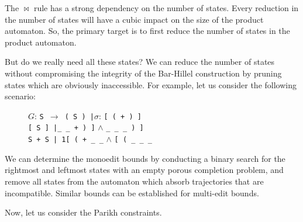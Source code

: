 The $\Join$ rule has a strong dependency on the number of states. Every reduction in the number of states will have a cubic impact on the size of the product automaton. So, the primary target is to first reduce the number of states in the product automaton.

But do we really need all these states? We can reduce the number of states without compromising the integrity of the Bar-Hillel construction by pruning states which are obviously inaccessible. For example, let us consider the following scenario:

\begin{figure}[H]
  \begin{center}
 
 \end{center}
\noindent$G$: \texttt{S $\rightarrow$ ( S ) |}\hspace{1.4cm}$\sigma$: \texttt{[ ( + ) ]}\phantom{...}\\
\noindent{}\texttt{[ S ] |}\texttt{\_ \_ + ) ]}\phantom{...}\phantom{...} $\land$ \phantom{...}\texttt{\_ \_ \_ ) ]}\phantom{...}\\
\noindent{}\texttt{S + S | 1}\texttt{[ ( + \_ \_}\phantom{...}\phantom{...} $\land$ \phantom{...}\texttt{[ ( \_ \_ \_}\phantom{...}
\end{figure}

We can determine the monoedit bounds by conducting a binary search for the rightmost and leftmost states with an empty porous completion problem, and remove all states from the automaton which absorb trajectories that are incompatible. Similar bounds can be established for multi-edit bounds.

Now, let us consider the Parikh constraints.